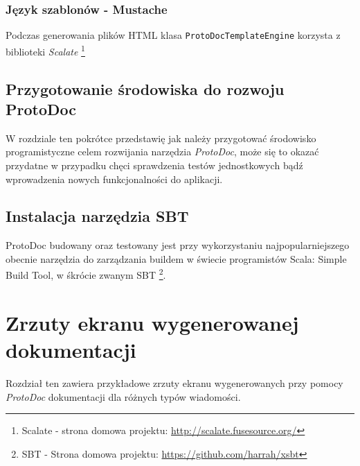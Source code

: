 \documentclass[pdflatex,11pt]{aghdpl}
\begin{document}
\subsection{Język szablonów - Mustache}
\label{sec:mustache}
Podczas generowania plików HTML klasa \verb|ProtoDocTemplateEngine| korzysta z biblioteki \textit{Scalate} \footnote{Scalate - strona domowa 
projektu: \href{http://scalate.fusesource.org/}{http://scalate.fusesource.org/}}

\section{Przygotowanie środowiska do rozwoju ProtoDoc}
\label{sec:prepare_env}
W rozdziale ten pokrótce przedstawię jak należy przygotować środowisko programistyczne celem rozwijania narzędzia \textit{ProtoDoc},
może się to okazać przydatne w przypadku chęci sprawdzenia testów jednostkowych bądź wprowadzenia nowych funkcjonalności do aplikacji.

\subsection{}

\section{Instalacja narzędzia SBT}
ProtoDoc budowany oraz testowany jest przy wykorzystaniu najpopularniejszego obecnie narzędzia do zarządzania buildem w świecie programistów Scala:
Simple Build Tool, w śkrócie zwanym SBT \footnote{SBT - Strona domowa projektu: \href{https://github.com/harrah/xsbt}{https://github.com/harrah/xsbt}}.




\newpage
\chapter{Zrzuty ekranu wygenerowanej dokumentacji}
\label{sec:screenshots}
Rozdział ten zawiera przykładowe zrzuty ekranu wygenerowanych przy pomocy \textit{ProtoDoc} dokumentacji dla różnych typów wiadomości.
\end{document}
